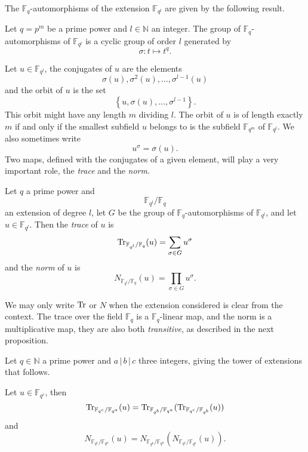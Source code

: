 The $\mathbb{F}_q$-automorphisms of the extension $\mathbb{F}_{q^l}$ are given
by the following result.
\begin{prop}
  Let $q=p^m$ be a prime power and $l\in\mathbb{N}$ an integer.
  The group of $\mathbb{F}_q$-automorphisms of $\mathbb{F}_{q^l}$ is a cyclic
  group of order $l$ generated by
  \[
    \sigma : t\mapsto t^q.
  \]  
\end{prop}
Let $u\in\mathbb{F}_{q^l}$, the conjugates of $u$ are the elements
\[
  \sigma(u), \sigma^2(u), \dots, \sigma^{l-1}(u)
\]
and the orbit of $u$ is the set
\[
  \left\{ u, \sigma(u), \dots, \sigma^{l-1} \right\}.
\]
This orbit might have any length $m$ dividing $l$. The orbit of $u$ is of length
exactly $m$ if and only if the smallest subfield $u$ belongs to is the subfield
$\mathbb{F}_{q^m}$ of $\mathbb{F}_{q^l}$. We also sometimes write
\[
  u^\sigma = \sigma(u).
\]
Two maps, defined with the conjugates of a given element,
will play a very important role, the \emph{trace} and the \emph{norm}.
\begin{defi}
  Let $q$ a prime power and 
  \[
    \mathbb{F}_{q^l}/\mathbb{F}_q
  \]
  an extension of degree $l$, let $G$ be the group of
  $\mathbb{F}_q$-automorphisms of $\mathbb{F}_{q^l}$, and let
  $u\in\mathbb{F}_{q^l}$. Then the \emph{trace} of $u$ is
  \[
    \operatorname{Tr}_{\mathbb{F}_{q^l}/\mathbb{F}_q}(u) = \sum_{\sigma\in G}u^\sigma
  \]
  and the \emph{norm} of $u$ is
  \[
    N_{\mathbb{F}_{q^l}/\mathbb{F}_q}(u)=\prod_{\sigma\in G}u^\sigma.
  \]
\end{defi}
We may only write $\operatorname{Tr}$ or $N$ when the extension considered is clear from the
context. The trace over the field $\mathbb{F}_{q}$ is a $\mathbb{F}_{q}$-linear
map, and the norm is a multiplicative map, they are also both \emph{transitive},
as described in the next proposition.
\begin{prop}
  Let $q\in\mathbb{N}$ a prime power and $a\,|\,b\,|\,c$ three integers, giving
  the tower of extensions that follows.
  \begin{center}
  \end{center}
  Let $u\in\mathbb{F}_{q^c}$, then
  \[
    \operatorname{Tr}_{\mathbb{F}_{q^c}/\mathbb{F}_{q^a}}(u) =
    \operatorname{Tr}_{\mathbb{F}_{q^b}/\mathbb{F}_{q^a}}(\operatorname{Tr}_{\mathbb{F}_{q^c}/\mathbb{F}_{q^b}}(u))
  \]
  and
  \[
    N_{\mathbb{F}_{q^c}/\mathbb{F}_{q^a}}(u) =
    N_{\mathbb{F}_{q^b}/\mathbb{F}_{q^a}}(N_{\mathbb{F}_{q^c}/\mathbb{F}_{q^b}}(u)).
  \]
\end{prop}
